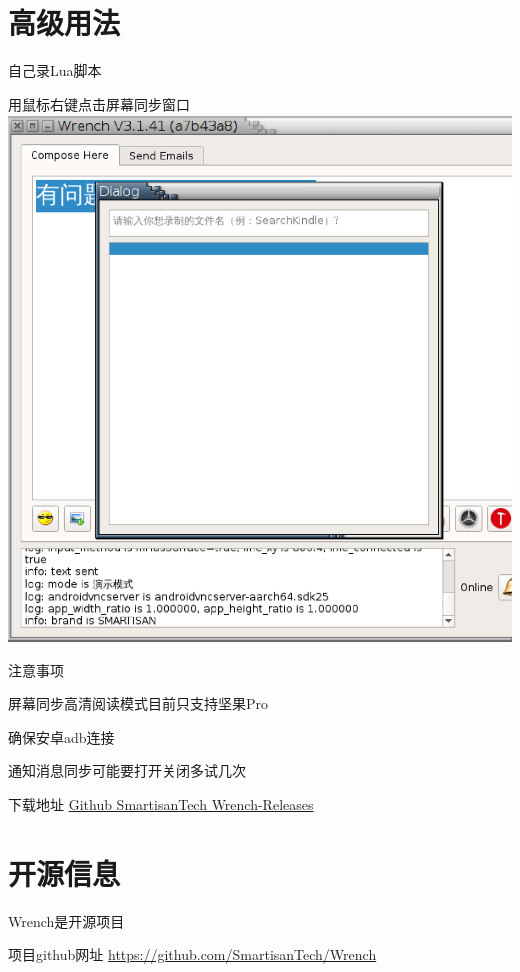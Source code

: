 \documentclass[presentation,dvipdfmx,CJKbookmarks]{beamer}
\begin{document}
\begin{CJK*}{UTF8}{simsun}
\section{高级用法}
\label{sec-4}
\begin{frame}[label=sec-4-1]{自己录\thinspace Lua\thinspace 脚本}
\begin{block}{用鼠标右键点击屏幕同步窗口}
\includegraphics[width=.9\linewidth]{./images/wrench-screen-record.ps}
\end{block}
\end{frame}

\begin{frame}[label=sec-4-2]{注意事项}
\begin{block}{屏幕同步高清阅读模式目前只支持坚果\thinspace Pro}
\end{block}
\begin{block}{确保安卓\thinspace adb\thinspace 连接}
\end{block}
\begin{block}{通知消息同步可能要打开关闭多试几次}
\end{block}
\begin{block}{下载地址}
\href{https://github.com/SmartisanTech/Wrench-releases/releases}{Github SmartisanTech Wrench-Releases}
\end{block}
\end{frame}
\section{开源信息}
\label{sec-5}
\begin{frame}[label=sec-5-1]{Wrench\thinspace 是开源项目}
\begin{block}{项目\thinspace github\thinspace 网址}
\url{https://github.com/SmartisanTech/Wrench}
\end{block}


\end{frame}
\end{CJK*}
\end{document}
